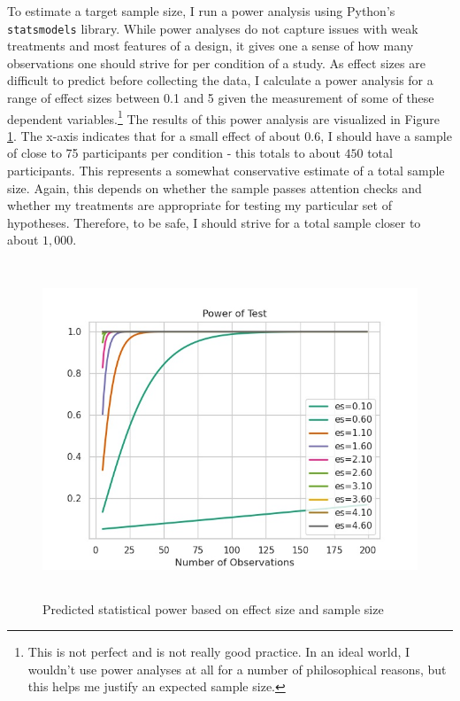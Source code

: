 \documentclass [12pt]{article}
\begin{document}
To estimate a target sample size, I run a power analysis using Python's \verb|statsmodels| library. While power analyses do not capture issues with weak treatments and most features of a design, it gives one a sense of how many observations one should strive for per condition of a study. As effect sizes are difficult to predict before collecting the data, I calculate a power analysis for a range of effect sizes between 0.1 and 5 given the measurement of some of these dependent variables.\footnote{This is not perfect and is not really good practice. In an ideal world, I wouldn't use power analyses at all for a number of philosophical reasons, but this helps me justify an expected sample size.} The results of this power analysis are visualized in Figure \ref{fig:power_analysis}. The x-axis indicates that for a small effect of about $0.6$, I should have a sample of close to 75 participants per condition - this totals to about $450$ total participants. This represents a somewhat conservative estimate of a total sample size. Again, this depends on whether the sample passes attention checks and whether my treatments are appropriate for testing my particular set of hypotheses. Therefore, to be safe, I should strive for a total sample closer to about $1,000$.

\begin{center}
	\begin{figure}
	\includegraphics[height = 100mm]{../figures/power_analysis}
	\caption{Predicted statistical power based on effect size and sample size}
	\label{fig:power_analysis}
\end{figure}
\end{center}
\end{document}
